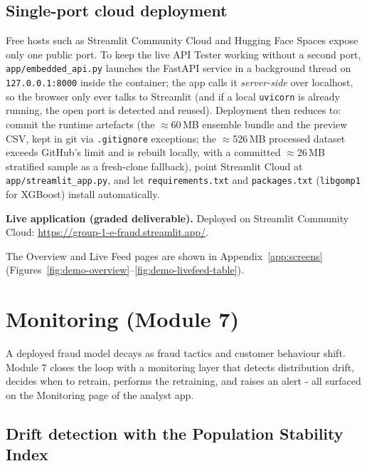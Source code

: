 \documentclass[11pt,a4paper]{report}
\newcommand{\code}[1]{\texttt{\small #1}}
\begin{document}
\section{Single-port cloud deployment}

Free hosts such as Streamlit Community Cloud and Hugging Face Spaces expose only one public
port. To keep the live API Tester working without a second port,
\code{app/embedded\_api.py} launches the FastAPI service in a background thread on
\code{127.0.0.1:8000} inside the container; the app calls it \emph{server-side} over
localhost, so the browser only ever talks to Streamlit (and if a local \code{uvicorn} is
already running, the open port is detected and reused). Deployment then reduces to: commit the
runtime artefacts (the $\approx$60\,MB ensemble bundle and the preview CSV, kept in git via
\code{.gitignore} exceptions; the $\approx$526\,MB processed dataset exceeds GitHub's limit and
is rebuilt locally, with a committed $\approx$26\,MB stratified sample as a fresh-clone fallback),
point Streamlit Cloud at
\code{app/streamlit\_app.py}, and let \code{requirements.txt} and \code{packages.txt}
(\code{libgomp1} for XGBoost) install automatically.

\begin{keybox}
\textbf{Live application (graded deliverable).} Deployed on Streamlit Community Cloud:
\url{https://group-1-e-fraud.streamlit.app/}.
\end{keybox}

The Overview and Live Feed pages are shown in Appendix~\ref{app:screens}
(Figures~\ref{fig:demo-overview}--\ref{fig:demo-livefeed-table}).

\chapter{Monitoring (Module 7)}
\label{ch:m7}

A deployed fraud model decays as fraud tactics and customer behaviour shift. Module 7 closes
the loop with a monitoring layer that detects distribution drift, decides when to retrain,
performs the retraining, and raises an alert - all surfaced on the Monitoring page of the
analyst app.

\section{Drift detection with the Population Stability Index}
\end{document}
